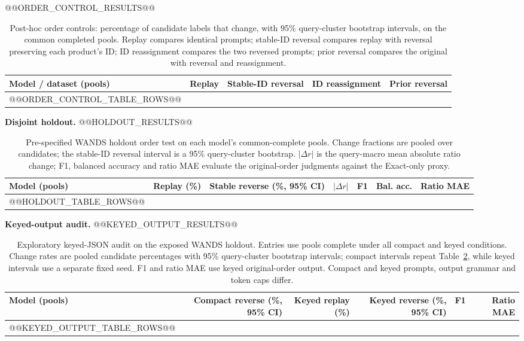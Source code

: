 \documentclass[conference]{IEEEtran}
\begin{document}
@@ORDER_CONTROL_RESULTS@@

\begin{table}[t]
\caption{Post-hoc order controls: percentage of candidate labels that change, with 95\% query-cluster bootstrap intervals, on the common completed pools. Replay compares identical prompts; stable-ID reversal compares replay with reversal preserving each product's ID; ID reassignment compares the two reversed prompts; prior reversal compares the original with reversal and reassignment.}
\label{tab:order_controls}
\centering\small
\begin{tabular}{lrrrr}
\toprule
Model / dataset (pools) & Replay & Stable-ID reversal & ID reassignment & Prior reversal \\
\midrule
@@ORDER_CONTROL_TABLE_ROWS@@
\bottomrule
\end{tabular}
\end{table}

\textbf{Disjoint holdout.}
@@HOLDOUT_RESULTS@@

\begin{table}[t]
\caption{Pre-specified WANDS holdout order test on each model's common-complete pools. Change fractions are pooled over candidates; the stable-ID reversal interval is a 95\% query-cluster bootstrap. $|\Delta r|$ is the query-macro mean absolute ratio change; F1, balanced accuracy and ratio MAE evaluate the original-order judgments against the Exact-only proxy.}
\label{tab:holdout}
\centering\small
\begin{tabular}{lrrrrrr}
\toprule
Model (pools) & Replay (\%) & Stable reverse (\%, 95\% CI) & $|\Delta r|$ & F1 & Bal. acc. & Ratio MAE \\
\midrule
@@HOLDOUT_TABLE_ROWS@@
\bottomrule
\end{tabular}
\end{table}

\textbf{Keyed-output audit.}
@@KEYED_OUTPUT_RESULTS@@

\begin{table}[t]
\caption{Exploratory keyed-JSON audit on the exposed WANDS holdout. Entries use pools complete under all compact and keyed conditions. Change rates are pooled candidate percentages with 95\% query-cluster bootstrap intervals; compact intervals repeat Table~\ref{tab:holdout}, while keyed intervals use a separate fixed seed. F1 and ratio MAE use keyed original-order output. Compact and keyed prompts, output grammar and token caps differ.}
\label{tab:keyed}
\centering\small
\begin{tabular}{lrrrrr}
\toprule
Model (pools) & Compact reverse (\%, 95\% CI) & Keyed replay (\%) & Keyed reverse (\%, 95\% CI) & F1 & Ratio MAE \\
\midrule
@@KEYED_OUTPUT_TABLE_ROWS@@
\bottomrule
\end{tabular}
\end{table}
\end{document}
